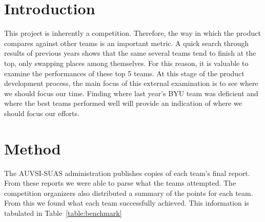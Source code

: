 \documentclass[]{auvsi_doc}
\begin{document}
\CapstoneTitlePage

\begin{artifacttable}

\section{Introduction}

This project is inherently a competition. Therefore, the way in which the product compares against other teams is an important metric.  A quick search through results of previous years shows that the same several teams tend to finish at the top, only swapping places among themselves. For this reason, it is valuable to examine the performances of these top 5 teams. At this stage of the product development process, the main focus of this external examination is to see where we should focus our time. Finding where last year's BYU team was deficient and where the best teams performed well will provide an indication of where we should focus our efforts.

\section{Method}
The AUVSI-SUAS administration publishes copies of each team's final report. From these reports we were able to parse what the teams attempted. The competition organizers also distributed a summary of the points for each team. From this we found what each team successfully achieved. This information is tabulated in Table~\ref{table:benchmark}

\begin{table}[h!]
	

\end{table}
\end{artifacttable}
\end{document}
